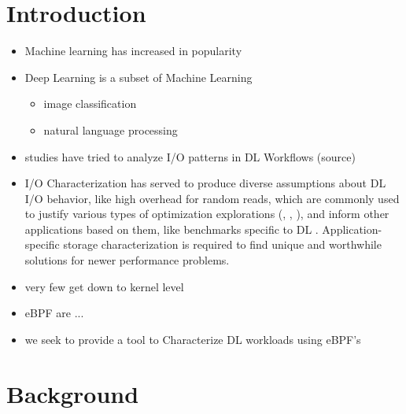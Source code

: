 \documentclass[conference]{IEEEtran}
\begin{document}
\section{Introduction}
\begin{itemize}
    \item Machine learning has increased in popularity
    \item Deep Learning is a subset of Machine Learning
    \begin{itemize}
        \item image classification
        \item natural language processing
    \end{itemize}
    \item studies have tried to analyze I/O patterns in DL Workflows (source)
    \item I/O Characterization has served to produce diverse assumptions about DL I/O behavior, like high overhead for random reads, which are commonly used to justify various types of optimization explorations (\cite{LMDB}, \cite{nvme}, \cite{beegfs}), and inform other applications based on them, like benchmarks specific to DL \cite{TFbenchmark}. Application-specific storage characterization is required to find unique and worthwhile solutions for newer performance problems.
    \item very few get down to kernel level
    \item eBPF are ...
    \item we seek to provide a tool to Characterize DL workloads using eBPF's
\end{itemize}

\section{Background}

    
\end{document}
